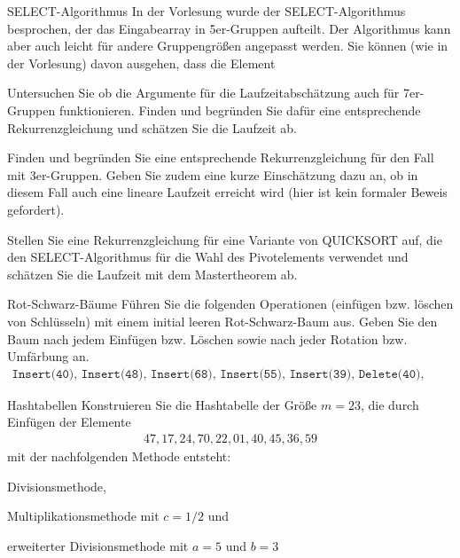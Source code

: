 \documentclass{exercisesheet}
\begin{document}
\begin{eexercises}{SELECT-Algorithmus}{
    In der Vorlesung wurde der SELECT-Algorithmus besprochen, der das Eingabearray in 5er-Gruppen aufteilt. Der Algorithmus kann aber auch leicht für andere Gruppengrößen angepasst werden. Sie können (wie in der Vorlesung) davon ausgehen, dass die Element
  }
  \item Untersuchen Sie ob die Argumente für die Laufzeitabschätzung auch für 7er-Gruppen funktionieren. Finden und begründen Sie dafür eine entsprechende Rekurrenzgleichung und schätzen Sie die Laufzeit ab.
  \item Finden und begründen Sie eine entsprechende Rekurrenzgleichung für den Fall mit 3er-Gruppen. Geben Sie zudem eine kurze Einschätzung dazu an, ob in diesem Fall auch eine lineare Laufzeit erreicht wird (hier ist kein formaler Beweis gefordert).
  \item Stellen Sie eine Rekurrenzgleichung für eine Variante von QUICKSORT auf, die den SELECT-Algorithmus für die Wahl des Pivotelements verwendet und schätzen Sie die Laufzeit mit dem Mastertheorem ab.
\end{eexercises}



\begin{exercise}{Rot-Schwarz-Bäume}
  Führen Sie die folgenden Operationen (einfügen bzw. löschen von Schlüsseln) mit einem initial leeren Rot-Schwarz-Baum aus. Geben Sie den Baum nach jedem Einfügen bzw. Löschen sowie nach jeder Rotation bzw. Umfärbung an.
  \begin{align*}\texttt{Insert(40), Insert(48), Insert(68), Insert(55), Insert(39), Delete(40), Delete(48)}\end{align*}
\end{exercise}

\begin{eexercises}{Hashtabellen}{
    Konstruieren Sie die Hashtabelle der Größe $m = 23$, die durch Einfügen der Elemente
    \begin{align*}47, 17, 24, 70, 22, 01, 40, 45, 36, 59\end{align*}
    mit der nachfolgenden Methode entsteht:
  }
  \item Divisionsmethode,
  \item Multiplikationsmethode mit $c = 1/2$ und
  \item erweiterter Divisionsmethode mit $a = 5$ und $b = 3$
\end{eexercises}
\end{document}
